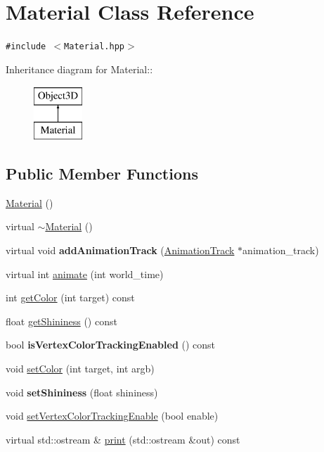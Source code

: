 \hypertarget{classm3g_1_1Material}{
\section{Material Class Reference}
\label{classm3g_1_1Material}
}
{\tt \#include $<$Material.hpp$>$}

Inheritance diagram for Material::\begin{figure}[H]
\begin{center}
\leavevmode
\includegraphics[height=2cm]{classm3g_1_1Material}
\end{center}
\end{figure}
\subsection*{Public Member Functions}
\begin{CompactItemize}
\item 
\hyperlink{classm3g_1_1Material_ade2019060d01e7983e9bc40ea6aa404}{Material} ()
\item 
virtual \hyperlink{classm3g_1_1Material_b15b7efa255e5cca9b02a031a783cfe8}{$\sim$Material} ()
\item 
\hypertarget{classm3g_1_1Material_415c0b110f95410ded9b85e5d99a496b}{
virtual void \textbf{addAnimationTrack} (\hyperlink{classm3g_1_1AnimationTrack}{AnimationTrack} $\ast$animation\_\-track)}
\label{classm3g_1_1Material_415c0b110f95410ded9b85e5d99a496b}

\item 
virtual int \hyperlink{classm3g_1_1Material_8aad1ceab4c2a03609c8a42324ce484d}{animate} (int world\_\-time)
\item 
int \hyperlink{classm3g_1_1Material_d5740043584c6bf87bf014402c5985be}{getColor} (int target) const 
\item 
float \hyperlink{classm3g_1_1Material_1bab082fe3510dbe7b98dd07b3976b5b}{getShininess} () const 
\item 
\hypertarget{classm3g_1_1Material_64fb5d60325fd073ab623d0eb04189d1}{
bool \textbf{isVertexColorTrackingEnabled} () const }
\label{classm3g_1_1Material_64fb5d60325fd073ab623d0eb04189d1}

\item 
void \hyperlink{classm3g_1_1Material_5947a525a18bca77aa890971df2ae48a}{setColor} (int target, int argb)
\item 
\hypertarget{classm3g_1_1Material_fb630e98bef48acb3b3c0541ed3615be}{
void \textbf{setShininess} (float shininess)}
\label{classm3g_1_1Material_fb630e98bef48acb3b3c0541ed3615be}

\item 
void \hyperlink{classm3g_1_1Material_55778ceeb6408e5db698c793dea1edd6}{setVertexColorTrackingEnable} (bool enable)
\item 
virtual std::ostream \& \hyperlink{classm3g_1_1Material_6fea17fa1532df3794f8cb39cb4f911f}{print} (std::ostream \&out) const 
\end{CompactItemize}
